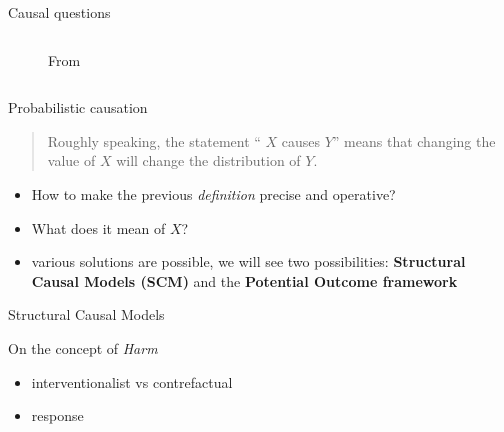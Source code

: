 \documentclass{beamer}
\begin{document}
\begin{frame}{Causal questions}
\begin{columns}
\begin{column}{0.5\textwidth}
{\begin{figure}
	  \caption{From \cite{Christiansen03042022}} 
	\end{figure}
      }
    \end{column}
  \end{columns}

\end{frame}


\begin{frame}{Probabilistic causation}

  \begin{block}{\citep[][AoS, Chapter 16]{wasserman2013all}}
    \begin{quote}
	Roughly speaking, the statement `` $X$ causes $Y$'' means that 
	changing the value of $X$ will change the distribution of $Y$.
      \end{quote}
  \end{block}
  \begin{itemize}
    \item<2-> How to make the previous \emph{definition} precise and operative? 
    \item<3-> What does it mean  of $X$? 
    \item<4-> various solutions are possible, we will see two possibilities:
      \textbf{Structural Causal Models (SCM)} and the \textbf{Potential Outcome framework}
  \end{itemize}
\end{frame}


\begin{frame}{Structural Causal Models}


\end{frame}


\begin{frame}

\end{frame}



\begin{frame}{On the concept of \emph{Harm}} 
  \begin{itemize}
    \item \cite{sarvet2023perspective}  interventionalist vs contrefactual  
    \item \cite{mueller2024perspective} response 
  \end{itemize}
\end{frame}
\end{document}
